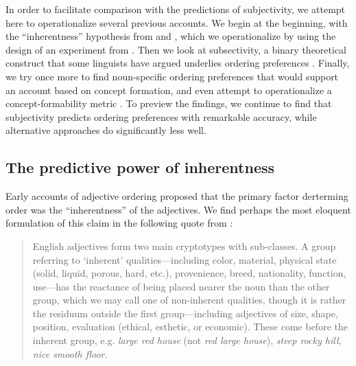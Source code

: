 \documentclass[12pt]{article}
\begin{document}

In order to facilitate comparison with the predictions of subjectivity, we attempt here to operationalize several previous accounts. We begin at the beginning, with the ``inherentness'' hypothesis from \citet{sweet1898} and \citet{whorf1945}, which we operationalize by using the design of an experiment from \citet{martin1969}. Then we look at subsectivity, a binary theoretical construct that some linguists have argued underlies ordering preferences \citep[e.g.,][]{truswell2009}. Finally, we try once more to find noun-specific ordering preferences that would support an account based on concept formation, and even attempt to operationalize a concept-formability metric \citep{McNally2004,bouchard2005,svenonius2008}. To preview the findings, we continue to find that subjectivity predicts ordering preferences with remarkable accuracy, while alternative approaches do significantly less well.

\subsection{The predictive power of inherentness}

Early accounts of adjective ordering proposed that the primary factor derterming order was the ``inherentness'' of the adjectives. We find perhaps the most eloquent formulation of this claim in the following quote from \cite[p.~5]{whorf1945}: 

\begin{quotation}
English adjectives form two main cryptotypes with sub-classes. A group referring to `inherent' qualities---including color, material, physical state (solid, liquid, porous, hard, etc.), provenience, breed, nationality, function, use---has the reactance of being placed nearer the noun than the other group, which we may call one of non-inherent qualities, though it is rather the residuum outside the first group---including adjectives of size, shape, position, evaluation (ethical, esthetic, or economic). These come before the inherent group, e.g. \emph{large red house} (not \emph{red large house}), \emph{steep rocky hill}, \emph{nice smooth floor}.
\end{quotation}
\end{document}
